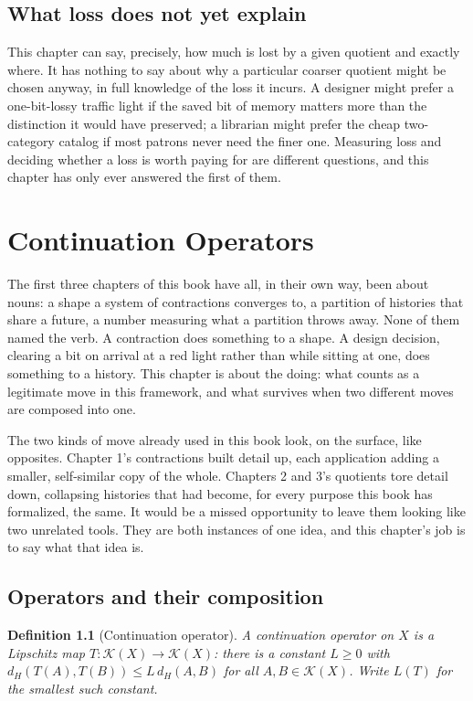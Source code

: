 \documentclass[11pt]{report}
\newtheorem{definition}{Definition}[chapter]
\begin{document}
\section*{What loss does not yet explain}

This chapter can say, precisely, how much is lost by a given
quotient and exactly where. It has nothing to say about why a
particular coarser quotient might be chosen anyway, in full knowledge
of the loss it incurs. A designer might prefer a one-bit-lossy
traffic light if the saved bit of memory matters more than the
distinction it would have preserved; a librarian might prefer the
cheap two-category catalog if most patrons never need the finer one.
Measuring loss and deciding whether a loss is worth paying for are
different questions, and this chapter has only ever answered the
first of them.

\chapter{Continuation Operators}

The first three chapters of this book have all, in their own way, been
about nouns: a shape a system of contractions converges to, a
partition of histories that share a future, a number measuring what a
partition throws away. None of them named the verb. A contraction
does something to a shape. A design decision, clearing a bit on
arrival at a red light rather than while sitting at one, does
something to a history. This chapter is about the doing: what counts
as a legitimate move in this framework, and what survives when two
different moves are composed into one.

The two kinds of move already used in this book look, on the surface,
like opposites. Chapter 1's contractions built detail up, each
application adding a smaller, self-similar copy of the whole. Chapters
2 and 3's quotients tore detail down, collapsing histories that had
become, for every purpose this book has formalized, the same. It
would be a missed opportunity to leave them looking like two
unrelated tools. They are both instances of one idea, and this
chapter's job is to say what that idea is.

\section*{Operators and their composition}

\begin{definition}[Continuation operator]
A continuation operator on $X$ is a Lipschitz map
$T : \mathcal{K}(X) \to \mathcal{K}(X)$: there is a constant
$L \geq 0$ with $d_H(T(A), T(B)) \leq L\, d_H(A,B)$ for all
$A, B \in \mathcal{K}(X)$. Write $L(T)$ for the smallest such constant.
\end{definition}
\end{document}
